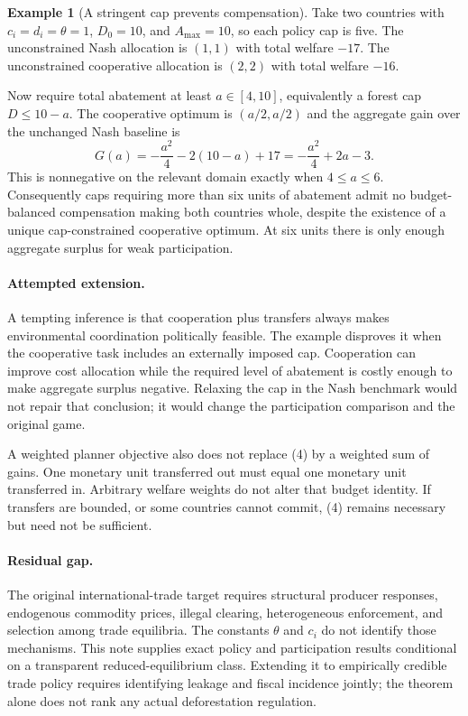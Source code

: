 \documentclass[11pt]{article}
\theoremstyle{definition}
\newtheorem{example}[theorem]{Example}
\begin{document}
\begin{example}[A stringent cap prevents compensation]
Take two countries with $c_i=d_i=\theta=1$, $D_0=10$, and $A_{\max}=10$, so each policy cap is five. The unconstrained Nash allocation is $(1,1)$ with total welfare $-17$. The unconstrained cooperative allocation is $(2,2)$ with total welfare $-16$.

Now require total abatement at least $a\in[4,10]$, equivalently a forest cap $D\leq10-a$. The cooperative optimum is $(a/2,a/2)$ and the aggregate gain over the unchanged Nash baseline is
\[
 G(a)=-\frac{a^2}{4}-2(10-a)+17
     =-\frac{a^2}{4}+2a-3.
\]
This is nonnegative on the relevant domain exactly when $4\leq a\leq6$. Consequently caps requiring more than six units of abatement admit no budget-balanced compensation making both countries whole, despite the existence of a unique cap-constrained cooperative optimum. At six units there is only enough aggregate surplus for weak participation.
\end{example}

\paragraph{Attempted extension.}
A tempting inference is that cooperation plus transfers always makes environmental coordination politically feasible. The example disproves it when the cooperative task includes an externally imposed cap. Cooperation can improve cost allocation while the required level of abatement is costly enough to make aggregate surplus negative. Relaxing the cap in the Nash benchmark would not repair that conclusion; it would change the participation comparison and the original game.

A weighted planner objective also does not replace (4) by a weighted sum of gains. One monetary unit transferred out must equal one monetary unit transferred in. Arbitrary welfare weights do not alter that budget identity. If transfers are bounded, or some countries cannot commit, (4) remains necessary but need not be sufficient.

\paragraph{Residual gap.}
The original international-trade target requires structural producer responses, endogenous commodity prices, illegal clearing, heterogeneous enforcement, and selection among trade equilibria. The constants $\theta$ and $c_i$ do not identify those mechanisms. This note supplies exact policy and participation results conditional on a transparent reduced-equilibrium class. Extending it to empirically credible trade policy requires identifying leakage and fiscal incidence jointly; the theorem alone does not rank any actual deforestation regulation.
\end{document}
